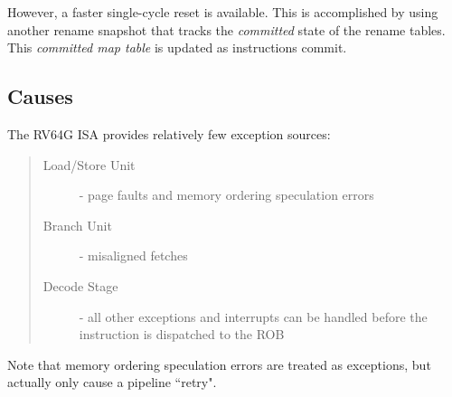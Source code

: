 However, a faster single-cycle reset is available.  This is accomplished by using another rename snapshot that tracks the {\em committed} state of the rename tables. This {\em committed map table} is updated as instructions commit. 

\subsection{Causes}

The RV64G ISA provides relatively few exception sources:

\begin{quote}
\begin{description}
\item[Load/Store Unit] - page faults and memory ordering speculation errors
\item[Branch Unit] - misaligned fetches
\item[Decode Stage] - all other exceptions and interrupts can be handled before the instruction is dispatched to the ROB
\end{description}
\end{quote}

Note that memory ordering speculation errors are treated as exceptions, but actually only cause a pipeline ``retry". 

